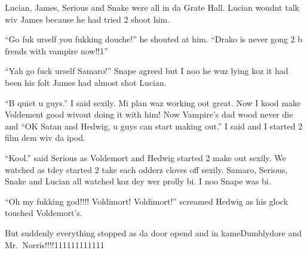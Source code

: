 Lucian, James, Serious and Snake were all in da Grate Hall. Lucian woudnt talk wiv James because he had tried 2 shoot him.

\enquote{Go fuk urself you fukking douche!} he shouted at him. \enquote{Drako is never gong 2 b frends with vampire now!!1}

\enquote{Yah go fuck urself Samaro!} Snape agreed but I noo he wuz lying koz it had been his folt James had almost shot Lucian.

\enquote{B quiet u guys.} I said sexily. Mi plan waz working oot great. Now I kood make Voldement good wivout doing it with him! Now Vampire's dad wood never die and \enquote{OK Satan and Hedwig, u guys can start making out.} I said and I started 2 film dem wiv da ipod.

\enquote{Kool.} said Serious as Voldemort and Hedwig started 2 make out sexily. We watched as tdey started 2 take each odderz cloves off sexily. Samaro, Serious, Snake and Lucian all watched koz dey wer prolly bi. I noo Snape was bi.

\enquote{Oh my fukking god!!!! Voldimort! Voldimort!} screamed Hedwig as his glock touched Voldemort's.

\begin{sloppypar}
    But suddenly everything stopped as da door opend and in kame\dotfill Dumblydore and Mr.~Norris!!!!111111111111
\end{sloppypar}

